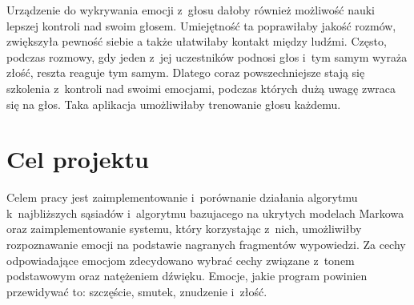 \documentclass[declaration,shortabstract]{iithesis}
\begin{document}
Urządzenie do wykrywania emocji z~głosu dałoby również możliwość nauki lepszej kontroli nad swoim głosem. Umiejętność ta poprawiłaby jakość rozmów, zwiększyła pewność siebie a także ułatwiłaby kontakt między ludźmi. Często, podczas rozmowy, gdy jeden z~jej uczestników podnosi głos i~tym samym wyraża złość, reszta reaguje tym samym. Dlatego coraz powszechniejsze stają się szkolenia z~kontroli nad swoimi emocjami, podczas których dużą uwagę zwraca się na głos. Taka aplikacja umożliwiłaby trenowanie głosu każdemu. 

\section{Cel projektu}
Celem pracy jest zaimplementowanie i~porównanie działania algorytmu k~najbliższych sąsiadów i~algorytmu bazujacego na ukrytych modelach Markowa oraz zaimplementowanie systemu, który korzystając z~nich, umożliwiłby rozpoznawanie emocji na podstawie nagranych fragmentów wypowiedzi.
Za cechy odpowiadające emocjom zdecydowano wybrać cechy związane z~tonem podstawowym oraz natężeniem dźwięku. Emocje, jakie program powinien przewidywać to: szczęście, smutek, znudzenie i~złość.
\end{document}
